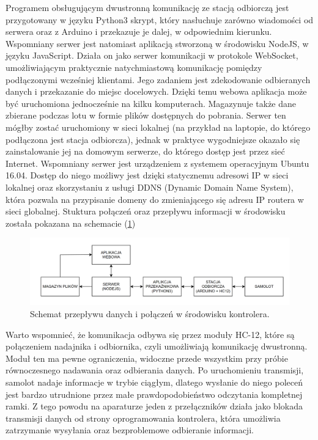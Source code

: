 \documentclass[12pt, a4paper]{article}
\let\oldref\ref
\renewcommand{\ref}[1]{(\oldref{#1})}
\begin{document}
Programem obsługującym dwustronną komunikację ze stacją odbiorczą jest przygotowany w języku Python3 skrypt, który nasłuchuje zarówno wiadomości od serwera oraz z Arduino i przekazuje je dalej, w odpowiednim kierunku. Wspomniany serwer jest natomiast aplikacją stworzoną w środowisku NodeJS, w języku JavaScript. Działa on jako serwer komunikacji w protokole WebSocket, umożliwiającym praktycznie natychmiastową komunikację pomiędzy podłączonymi wcześniej klientami. Jego zadaniem jest zdekodowanie odbieranych danych i przekazanie do miejsc docelowych. Dzięki temu webowa aplikacja może być uruchomiona jednocześnie na kilku komputerach. Magazynuje także dane zbierane podczas lotu w formie plików dostępnych do pobrania. Serwer ten mógłby zostać uruchomiony w sieci lokalnej (na przykład na laptopie, do którego podłączona jest stacja odbiorcza), jednak w praktyce wygodniejsze okazało się zainstalowanie jej na domowym serwerze, do którego dostęp jest przez sieć Internet. Wspomniany serwer jest urządzeniem z systemem operacyjnym Ubuntu 16.04. Dostęp do niego możliwy jest dzięki statycznemu adresowi IP w sieci lokalnej oraz skorzystaniu z usługi DDNS (Dynamic Domain Name System), która pozwala na przypisanie domeny do zmieniającego się adresu IP routera w sieci globalnej. Stuktura połączeń oraz przepływu informacji w środowisku została pokazana na schemacie \ref{fig:env}

 \begin{figure}[ht]
    \centering
    \includegraphics[width=1\textwidth]{diagram_env}
    \caption{Schemat przepływu danych i połączeń w środowisku kontrolera.}
    \label{fig:env}
\end{figure}

Warto wspomnieć, że komunikacja odbywa się przez moduły HC-12, które są połączeniem nadajnika i odbiornika, czyli umożliwiają komunikację dwustronną. Moduł ten ma pewne ograniczenia, widoczne przede wszystkim przy próbie równoczesnego nadawania oraz odbierania danych. Po uruchomieniu transmisji, samolot nadaje informacje w trybie ciągłym, dlatego wysłanie do niego poleceń jest bardzo utrudnione przez małe prawdopodobieństwo odczytania kompletnej ramki. Z tego powodu na aparaturze jeden z przełączników działa jako blokada transmisji danych od strony oprogramowania kontrolera, która umożliwia zatrzymanie wysyłania oraz bezproblemowe odbieranie informacji.
\end{document}
